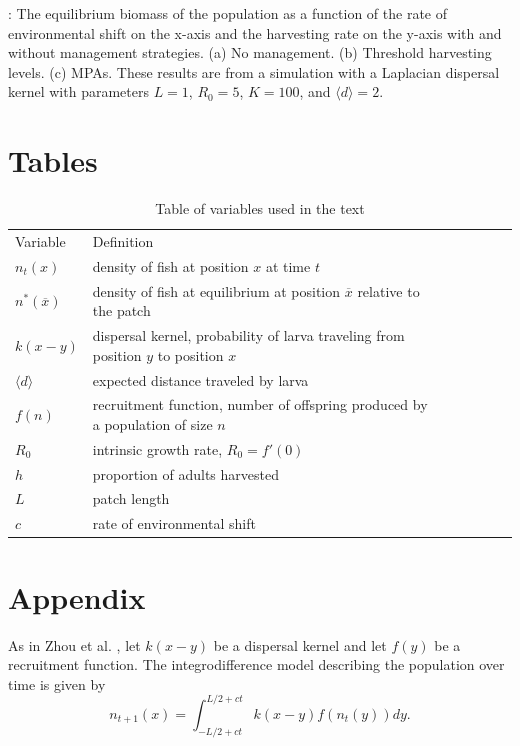 \documentclass[12pt,english]{article}
\begin{document}
\pagebreak

: The equilibrium biomass of the population as a function of the rate of environmental shift on the x-axis and the harvesting rate on the y-axis with and without management strategies.  (a) No management.  (b) Threshold harvesting levels.  (c) MPAs.  These results are from a simulation with a Laplacian dispersal kernel with parameters $L=1$, $R_0=5$, $K=100$, and $\langle d \rangle =2$.

\pagebreak

\section{Tables}
\begin{table}[h]
\caption{Table of variables used in the text}
\begin{tabular}{@{}lllllll@{}}
  Variable & Definition
\\\cmidrule{1-1} \cmidrule{2-2}   
$n_t(x)$ & density of fish at position $x$ at time $t$
\\ $n^*(\overline{x})$ & density of fish at equilibrium at position $\overline{x}$ relative to the patch 
\\ $k(x-y)$ & dispersal kernel, probability of larva traveling from position $y$ to position $x$
\\ $\langle d \rangle $ & expected distance traveled by larva
\\ $f(n)$ & recruitment function, number of offspring produced by a population of size $n$
\\ $R_0$ & intrinsic growth rate, $R_0=f'(0)$
\\ $h$ & proportion of adults harvested
\\ $L$ & patch length
\\ $c$ & rate of environmental shift
\end{tabular}
\label{variables}
\end{table}

\pagebreak

\section{Appendix}

As in Zhou et al. \citep{ZhouKot2011}, let $k(x-y)$ be a dispersal kernel and let $f(y)$ be a recruitment function.  The integrodifference model describing the population over time is given by 
\begin{equation} n_{t+1}(x)=\int_{-L/2+ct}^{L/2+ct}k(x-y)f(n_t(y))dy. \label{integro} \end{equation}
\end{document}
